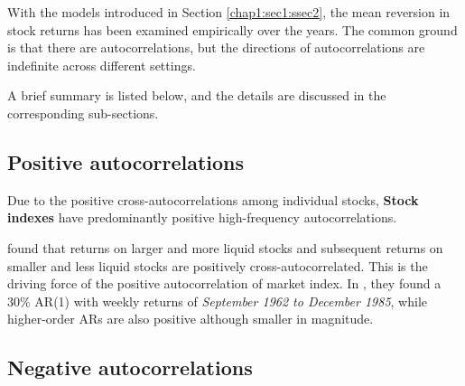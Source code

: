 With the models introduced in Section \ref{chap1:sec1:ssec2}, the mean reversion in stock returns
has been examined empirically over the years. The common ground is that there are autocorrelations,
but the directions of autocorrelations are indefinite across different settings.

A brief summary is listed below, and the details are discussed in the corresponding sub-sections.

\subsection{Positive autocorrelations}
Due to the positive cross-autocorrelations among individual stocks, \textbf{Stock indexes} have predominantly
positive high-frequency autocorrelations.

\citet{lo1988stock,lo1990contrarian} found that returns on larger and more liquid stocks and subsequent
returns on smaller and less liquid stocks are positively cross-autocorrelated. This is the driving force of 
the positive autocorrelation of market index. In \citeyear{lo1988stock}, they found a 30\% AR(1) with weekly returns
of \textit{September 1962 to December 1985}, while higher-order ARs are also positive although smaller in magnitude.


\subsection{Negative autocorrelations}

